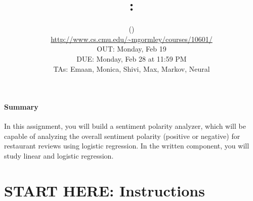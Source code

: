 \documentclass[11pt,addpoints,answers]{exam}
\title{\textsc{\hwNum}: \textsc{\hwTopic}
} %
\author{\courseNum \courseName (\courseSem)\\
\url{http://www.cs.cmu.edu/~mgormley/courses/10601/} \\
OUT: Monday, Feb 19 \\
DUE: Monday, Feb 28 at 11:59 PM \\
TAs: Emaan, Monica, Shivi, Max, Markov, Neural
}
\date{}
\date{}
\begin{document}
\maketitle

\begin{notebox}
\paragraph{Summary} In this assignment, you will build a sentiment polarity analyzer, which will be capable of analyzing the overall sentiment polarity (positive or negative) for restaurant reviews using logistic regression. In the written component, you will study linear and logistic regression.
\end{notebox}\section*{START HERE: Instructions}
\end{document}
